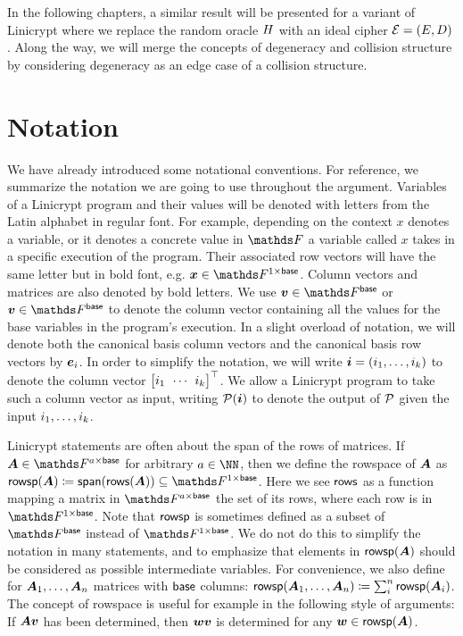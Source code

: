 In the following chapters, a similar result will be presented for a variant of Linicrypt
where we replace the random oracle $\H$ with an ideal cipher $\BC=(\E, \D)$.
Along the way,
we will merge the concepts of degeneracy and collision structure by considering degeneracy as an edge case of a collision structure.

\section{Notation}
We have already introduced some notational conventions.
For reference, we summarize the notation we are going to use throughout the argument.
Variables of a Linicrypt program and their values will be denoted with letters from the Latin alphabet in regular font.
For example, depending on the context $x$ denotes a variable, or it denotes a concrete value in $\F$ a variable called $x$ takes in a specific execution of the program.
Their associated row vectors will have the same letter but in bold font, e.g. $\vx \in \Frowsp$.
Column vectors and matrices are also denoted by bold letters.
We use $\vbase \in \Fsp$ or $\vv \in \Fsp$ to denote the column vector containing all the values for the base variables in the program's execution.
In a slight overload of notation,
we will denote both the canonical basis column vectors and the canonical basis row vectors by $\ve_i$.
In order to simplify the notation,
we will write $\vi = (i_1, \dots, i_k)$ to denote the column vector $\m{i_1 & \cdots & i_k}^\top$.
We allow a Linicrypt program to take such a column vector as input,
writing $\P(\vi)$ to denote the output of $\P$ given the input $\dts i k$. 

Linicrypt statements are often about the span of the rows of matrices.
If $\v A \in \F^{a\times\base}$ for arbitrary $a \in \NN$,
then we define the rowspace of $\v A$ as $\rowsp(\v A) \coloneqq \spn(\rows(\v A)) \subseteq \Frowsp$.
Here we see $\rows$ as a function mapping a matrix in $\F^{a\times\base}$ the set of its rows, where each row is in $\Frowsp$.
Note that $\rowsp$ is sometimes defined as a subset of $\Fsp$ instead of $\Frowsp$.
We do not do this to simplify the notation in many statements,
and to emphasize that elements in $\rowsp(\v A)$ should be considered as possible intermediate variables.
For convenience, we also define for $\dts{\v A}{n}$ matrices with $\base$ columns: $\rowsp(\dts{\v A}{n}) \coloneqq \sum_i^n \rowsp(\v A_i)$.
The concept of rowspace is useful for example in the following style of arguments:
If $\v A\vv$ has been determined, then $\vw\vv$ is determined for any $\vw \in \rowsp(\v A)$.

